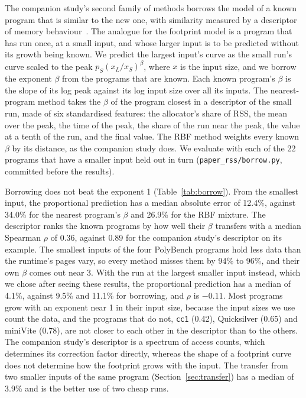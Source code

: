 \documentclass[11pt]{article}
\newcommand{\secref}[1]{Section~\ref{#1}}
\newcommand{\tabref}[1]{Table~\ref{#1}}
\begin{document}
The companion study's second family of methods borrows the model of a known program that is similar to the new one,
with similarity measured by a descriptor of memory behaviour~\cite{memprintstatic}. The analogue for the footprint
model is a program that has run once, at a small input, and whose larger input is to be predicted without its growth
being known. We predict the largest input's curve as the small run's curve scaled to the peak $p_S (x_L / x_S)^\beta$,
where $x$ is the input size, and we borrow the exponent $\beta$ from the programs that are known. Each known program's
$\beta$ is the slope of its log peak against its log input size over all its inputs. The nearest-program method takes
the $\beta$ of the program closest in a descriptor of the small run, made of six standardised features: the
allocator's share of RSS, the mean over the peak, the time of the peak, the share of the run near the peak, the
value at a tenth of the run, and the final value. The RBF method weights every known $\beta$ by its distance, as the
companion study does. We evaluate with each of the 22 programs that have a smaller input held out in turn
(\texttt{paper\_rss/borrow.py}, committed before the results).

Borrowing does not beat the exponent 1 (\tabref{tab:borrow}). From the smallest input, the proportional prediction
has a median absolute error of 12.4\%, against 34.0\% for the nearest program's $\beta$ and 26.9\% for the RBF
mixture. The descriptor ranks the known programs by how well their $\beta$ transfers with a median Spearman $\rho$ of
0.36, against 0.89 for the companion study's descriptor on its example. The smallest inputs of the four PolyBench
programs hold less data than the runtime's pages vary, so every method misses them by 94\% to 96\%, and their own
$\beta$ comes out near 3. With the run at the largest smaller input instead, which we chose after seeing these
results, the proportional prediction has a median of 4.1\%, against 9.5\% and 11.1\% for borrowing, and $\rho$ is
$-0.11$. Most programs grow with an exponent near 1 in their input size, because the input sizes we use count the
data, and the programs that do not, \texttt{cc1} (0.42), Quicksilver (0.65) and miniVite (0.78), are not closer to
each other in the descriptor than to the others. The companion study's descriptor is a spectrum of access counts,
which determines its correction factor directly, whereas the shape of a footprint curve does not determine how the
footprint grows with the input. The transfer from two smaller inputs of the same program (\secref{sec:transfer}) has
a median of 3.9\% and is the better use of two cheap runs.
\end{document}
